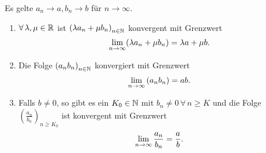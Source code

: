 \documentclass[../ana1.tex]{subfiles}
\begin{document}
\begin{satz}
	Es gelte \(a_n\rightarrow a, b_n \rightarrow b\) für \(n\rightarrow\infty \).
	\begin{enumerate}
		\item \(\forall \lambda, \mu \in\R \) ist \( {(\lambda a_n + \mu b_n)}_{n\in\mathbb{N}} \) konvergent mit Grenzwert 
		\[\lim\limits_{n\rightarrow\infty} (\lambda a_n + \mu b_n) = \lambda a + \mu b.\]
		\item Die Folge \( {(a_n b_n)}_{n\in\mathbb{N}} \) konvergiert mit Grenzwert 
		\[\lim\limits_{n\rightarrow\infty} {(a_n b_n)} = ab.\]
		\item Falls \(b\neq 0\), so gibt es ein \(K_0 \in\mathbb{N} \) mit \(b_n \neq 0 \, \forall \, n\geq K\) und die Folge \( {\left(\frac{a_n}{b_n}\right)}_{n\geq K_0}\) ist konvergent mit Grenzwert 
		\[\lim\limits_{n\rightarrow\infty} \frac{a_n}{b_n} = \frac{a}{b}.\]
	\end{enumerate}
\end{satz}
\end{document}
